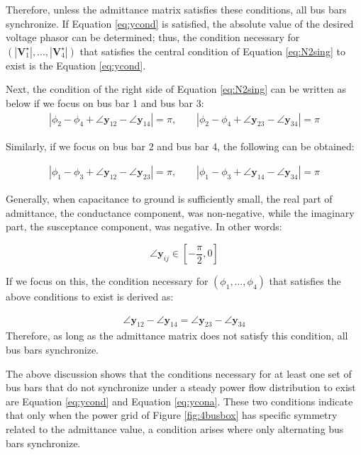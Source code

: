 \documentclass[graybox, envcountchap]{svmult}
\begin{document}
\begin{example}
Therefore, unless the admittance matrix satisfies these conditions, all bus bars synchronize.
If Equation \ref{eq:ycond} is satisfied, the absolute value of the desired voltage phasor can be determined; thus, the condition necessary for $(|\bm{V}_1^{\star}|,\ldots,|\bm{V}_4^{\star}|)$ that satisfies the central condition of Equation \ref{eq:N2sing} to exist is the Equation \ref{eq:ycond}.

Next, the condition of the right side of Equation \ref{eq:N2sing} can be written as below if we focus on bus bar 1 and bus bar 3:
\begin{align*}
|\phi_2 - \phi_4 + \angle \bm{y}_{12} - \angle \bm{y}_{14}|=\pi
,\qquad
|\phi_2 - \phi_4 + \angle \bm{y}_{23} - \angle \bm{y}_{34}|=\pi
\end{align*}

Similarly, if we focus on bus bar 2 and bus bar 4, the following can be obtained:

\begin{align*}
|\phi_1 - \phi_3 + \angle \bm{y}_{12} - \angle \bm{y}_{23}|=\pi
,\qquad
|\phi_1 - \phi_3 + \angle \bm{y}_{14} - \angle \bm{y}_{34}|=\pi
\end{align*}

Generally, when capacitance to ground is sufficiently small, the real part of admittance, the conductance component, was non-negative, while the imaginary part, the susceptance component, was negative.
In other words:

\[
\angle \bm{y}_{ij} \in \left[-\frac{\pi}{2},0 \right]
\]

If we focus on this, the condition necessary for $(\phi_1,\ldots,\phi_4)$ that satisfies the above conditions to exist is derived as:

\begin{align}\label{eq:ycona}
\angle \bm{y}_{12} - \angle \bm{y}_{14}=
\angle \bm{y}_{23} - \angle \bm{y}_{34}
\end{align}
Therefore, as long as the admittance matrix does not satisfy this condition, all bus bars synchronize.

The above discussion shows that the conditions necessary for at least one set of bus bars that do not synchronize under a steady power flow distribution to exist are Equation \ref{eq:ycond} and Equation \ref{eq:ycona}.
These two conditions indicate that only when the power grid of Figure \ref{fig:4busbox} has specific symmetry related to the admittance value, a condition arises where only alternating bus bars synchronize.
\end{example}
\end{document}
